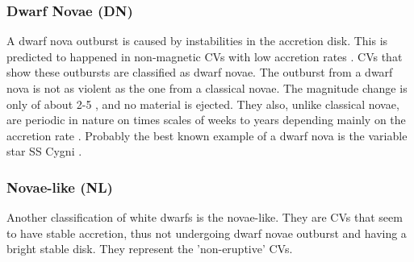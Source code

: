 
\subsubsection{Dwarf Novae (DN)}

A dwarf nova outburst is caused by instabilities in the accretion disk. This is predicted to happened in non-magnetic CVs with low accretion rates \citep{osaki_accretion_1974}. CVs that show these outbursts are classified as dwarf novae. The outburst from a dwarf nova is not as violent as the one from a classical novae. The magnitude change is only of about 2-5 , and no material is ejected. They also, unlike classical novae, are periodic in nature on times scales of weeks to years depending mainly on the accretion rate \citep{shara_recent_1989}. Probably the best known example of a dwarf nova is the variable star SS Cygni \citep{cannizzo_study_1998}. 

\subsubsection{Novae-like (NL)}


Another classification of white dwarfs is the novae-like. They are CVs that seem to have stable accretion, thus not undergoing dwarf novae outburst and having a bright stable disk. They represent the 'non-eruptive' CVs.



